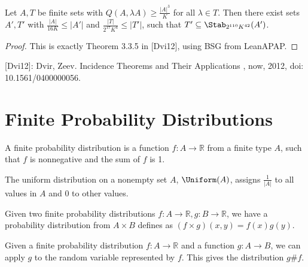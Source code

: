 \begin{theorem}
    \label{Theorem335}
    \leanok

    Let $A, T$ be finite sets with $Q(A, \lambda A) \geq \frac{|A|^3}K$ for all $\lambda \in T$.
    Then there exist sets $A', T'$ with $\frac{|A|}{16 K} \leq |A'|$ and
        $\frac{|T|}{2^{17} K^4} \leq |T'|$, such that $T' \subseteq \Stab_{2^{110} K^{42}}(A')$.
\end{theorem}

\begin{proof}
    \leanok
    This is exactly Theorem 3.3.5 in [Dvi12], using BSG from LeanAPAP.
\end{proof}

[Dvi12]: Dvir, Zeev. Incidence Theorems and Their Applications , now, 2012, doi: 10.1561/0400000056.

\chapter{Finite Probability Distributions}
\label{chap:finpmf}

\begin{definition}
    \label{FinPMF}
    \leanok
    A finite probability distribution is a function $f : A \to \mathbb{R}$ from a finite type $A$, such that $f$ is nonnegative and the sum of $f$ is
    1.
\end{definition}

\begin{definition}
    \label{Uniform}
    \leanok
    The uniform distribution on a nonempty set $A$, $\Uniform(A)$, assigns $\frac1{|A|}$ to all values in $A$ and $0$ to other values.
\end{definition}

\begin{definition}
    \label{instMulFinPMF}
    \leanok
    Given two finite probability distributions $f: A \to \mathbb{R}, g : B \to \mathbb{R}$, we have a probability distribution
    from $A \times B$ defines as $(f \times g)(x, y) = f(x) g(y)$.
\end{definition}

\begin{definition}
    \label{FinPMF.apply}
    \leanok
    Given a finite probability distribution $f: A \to \mathbb{R}$ and a function $g : A \to B$, we can apply $g$ to the random variable
    represented by $f$. This gives the distribution $g \# f$.
\end{definition}

